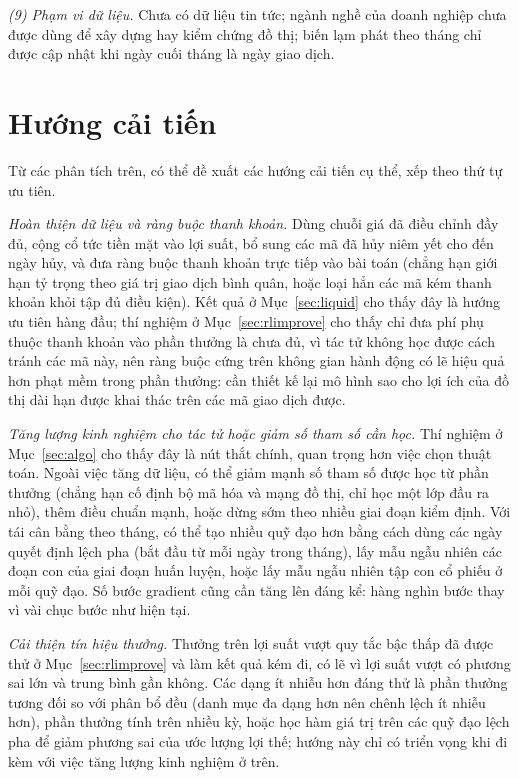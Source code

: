 \textit{(9) Phạm vi dữ liệu.} Chưa có dữ liệu tin tức; ngành nghề của doanh nghiệp chưa được dùng để xây dựng hay kiểm chứng đồ thị; biến lạm phát theo tháng chỉ được cập nhật khi ngày cuối tháng là ngày giao dịch.

\section{Hướng cải tiến}
\label{sec:caitien}

Từ các phân tích trên, có thể đề xuất các hướng cải tiến cụ thể, xếp theo thứ tự ưu tiên.

\textit{Hoàn thiện dữ liệu và ràng buộc thanh khoản.} Dùng chuỗi giá đã điều chỉnh đầy đủ, cộng cổ tức tiền mặt vào lợi suất, bổ sung các mã đã hủy niêm yết cho đến ngày hủy, và đưa ràng buộc thanh khoản trực tiếp vào bài toán (chẳng hạn giới hạn tỷ trọng theo giá trị giao dịch bình quân, hoặc loại hẳn các mã kém thanh khoản khỏi tập đủ điều kiện). Kết quả ở Mục~\ref{sec:liquid} cho thấy đây là hướng ưu tiên hàng đầu; thí nghiệm ở Mục~\ref{sec:rlimprove} cho thấy chỉ đưa phí phụ thuộc thanh khoản vào phần thưởng là chưa đủ, vì tác tử không học được cách tránh các mã này, nên ràng buộc cứng trên không gian hành động có lẽ hiệu quả hơn phạt mềm trong phần thưởng: cần thiết kế lại mô hình sao cho lợi ích của đồ thị dài hạn được khai thác trên các mã giao dịch được.

\textit{Tăng lượng kinh nghiệm cho tác tử hoặc giảm số tham số cần học.} Thí nghiệm ở Mục~\ref{sec:algo} cho thấy đây là nút thắt chính, quan trọng hơn việc chọn thuật toán. Ngoài việc tăng dữ liệu, có thể giảm mạnh số tham số được học từ phần thưởng (chẳng hạn cố định bộ mã hóa và mạng đồ thị, chỉ học một lớp đầu ra nhỏ), thêm điều chuẩn mạnh, hoặc dừng sớm theo nhiều giai đoạn kiểm định. Với tái cân bằng theo tháng, có thể tạo nhiều quỹ đạo hơn bằng cách dùng các ngày quyết định lệch pha (bắt đầu từ mỗi ngày trong tháng), lấy mẫu ngẫu nhiên các đoạn con của giai đoạn huấn luyện, hoặc lấy mẫu ngẫu nhiên tập con cổ phiếu ở mỗi quỹ đạo. Số bước gradient cũng cần tăng lên đáng kể: hàng nghìn bước thay vì vài chục bước như hiện tại.

\textit{Cải thiện tín hiệu thưởng.} Thưởng trên lợi suất vượt quy tắc bậc thấp đã được thử ở Mục~\ref{sec:rlimprove} và làm kết quả kém đi, có lẽ vì lợi suất vượt có phương sai lớn và trung bình gần không. Các dạng ít nhiễu hơn đáng thử là phần thưởng tương đối so với phân bổ đều (danh mục đa dạng hơn nên chênh lệch ít nhiễu hơn), phần thưởng tính trên nhiều kỳ, hoặc học hàm giá trị trên các quỹ đạo lệch pha để giảm phương sai của ước lượng lợi thế; hướng này chỉ có triển vọng khi đi kèm với việc tăng lượng kinh nghiệm ở trên.

